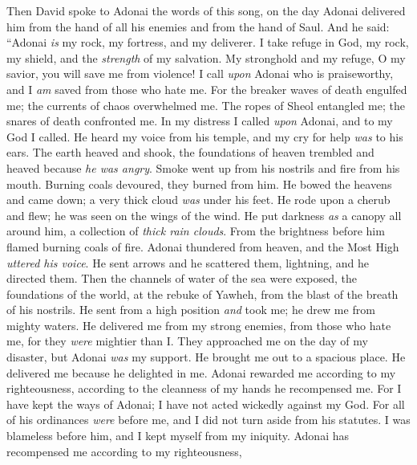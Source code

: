 \begin{biblechapter} %
 Then David spoke to Adonai the words of this song, on the day Adonai delivered him from the hand of all his enemies and from the hand of Saul.
\verse And he said: 
“Adonai \textit{is} my rock, my fortress, and my deliverer.
\verse I take refuge in God, my rock, my shield, and the \textit{strength} of my salvation. 
My stronghold and my refuge, O my savior, you will save me from violence!
\verse I call \textit{upon} Adonai who is praiseworthy, 
and I \textit{am} saved from those who hate me.
\verse For the breaker waves of death engulfed me; 
the currents of chaos overwhelmed me.
\verse The ropes of Sheol entangled me; 
the snares of death confronted me.
\verse In my distress I called \textit{upon} Adonai, and to my God I called. 
He heard my voice from his temple, 
and my cry for help \textit{was} to his ears.
\verse The earth heaved and shook, 
the foundations of heaven trembled and heaved 
because \textit{he was angry}.
\verse Smoke went up from his nostrils and fire from his mouth. 
Burning coals devoured, they burned from him.
\verse He bowed the heavens and came down; 
a very thick cloud \textit{was} under his feet.
\verse He rode upon a cherub and flew; 
he was seen on the wings of the wind.
\verse He put darkness \textit{as} a canopy all around him, 
a collection of \textit{thick rain clouds}.
\verse From the brightness before him 
flamed burning coals of fire.
\verse Adonai thundered from heaven, 
and the Most High \textit{uttered his voice}.
\verse He sent arrows and he scattered them, 
lightning, and he directed them.
\verse Then the channels of water of the sea were exposed, 
the foundations of the world, 
at the rebuke of Yawheh, 
from the blast of the breath of his nostrils.
\verse He sent from a high position \textit{and} took me; 
he drew me from mighty waters.
\verse He delivered me from my strong enemies, 
from those who hate me, for they \textit{were} mightier than I.
\verse They approached me on the day of my disaster, 
but Adonai \textit{was} my support.
\verse He brought me out to a spacious place. 
He delivered me because he delighted in me.
\verse Adonai rewarded me according to my righteousness, 
according to the cleanness of my hands he recompensed me.
\verse For I have kept the ways of Adonai; 
I have not acted wickedly against my God.
\verse For all of his ordinances \textit{were} before me, 
and I did not turn aside from his statutes.
\verse I was blameless before him, 
and I kept myself from my iniquity.
\verse Adonai has recompensed me according to my righteousness, 

\end{biblechapter}
